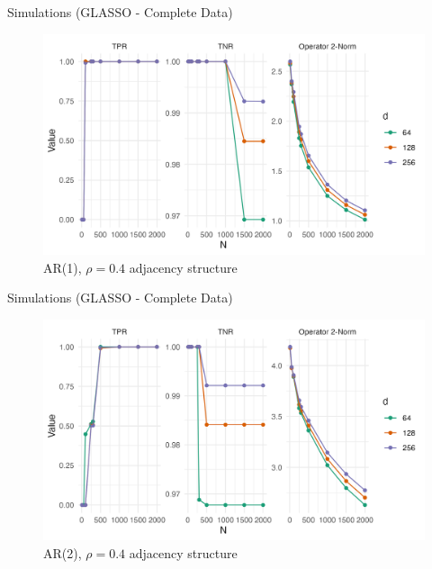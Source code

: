 \documentclass{beamer}
\begin{document}
\begin{frame}{Simulations (GLASSO - Complete Data)}
    \begin{figure}
        \centering 
        \includegraphics[scale=0.65]{glasso_complete_fixN_b1.png}
        \caption{AR(1), $\rho=0.4$ adjacency structure}
    \end{figure}
\end{frame}


\begin{frame}{Simulations (GLASSO - Complete Data)}
    \begin{figure}
        \centering 
        \includegraphics[scale=0.65]{glasso_complete_fixN_b2.png}
        \caption{AR(2), $\rho=0.4$ adjacency structure}
    \end{figure}
\end{frame}
\end{document}
